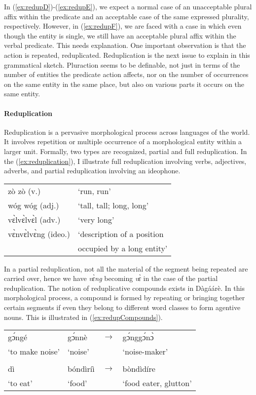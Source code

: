 In (\ref{ex:redupD})-(\ref{ex:redupE}), we expect a normal case of an unacceptable plural affix within the predicate and
an acceptable case of the same expressed plurality, respectively. However, in (\ref{ex:redupF}), we are
faced with a case in which even though the entity is single, we still have an acceptable plural
affix within the verbal predicate. This needs explanation. One important observation is that
the action is repeated, reduplicated. Reduplication is the next issue to explain in this
grammatical sketch. Pluraction seems to be definable, not just in terms of the number of
entities the predicate action affects, nor on the number of occurrences on the same entity in
the same place, but also on various parts it occurs on the same entity.

\paragraph{Reduplication}
Reduplication is a pervasive morphological process across languages of the world. It
involves repetition or multiple occurrence of a morphological entity within a larger unit.
Formally, two types are recognized, partial and full reduplication. In the (\ref{ex:reduplication}), I illustrate full reduplication involving verbs, adjectives, adverbs, and partial
reduplication involving an ideophone.

\ea \label{ex:reduplication} \begin{tabular}{ll}   zò zò (v.)& ‘run, run’\\
 wóg wóg (adj.)& ‘tall, tall; long, long’\\
 vɛ̀lvɛ̀lvɛ̀l (adv.)& ‘very long’\\
 vɛ̀nvɛ̀lvɛ̀ng (ideo.) & ‘description of a position \\
 &occupied by a long entity’\\
 \end{tabular}\z

In a partial reduplication, not all the material of the segment being repeated are carried over,
hence we have \textit{vɛ̀ng} becoming \textit{vɛ̀} in the case of the partial reduplication.
The notion of reduplicative compounds exists in Dàgáárè. In this morphological process, a
compound is formed by repeating or bringing together certain segments if even they belong to
different word classes to form agentive nouns. This is illustrated in (\ref{ex:redupCompounds}).


\ea \label{ex:redupCompounds} \begin{tabular}{llll} 
 gɔ́ngé& gɔ́nnè& $\rightarrow$ &gɔ́nggɔ́nɔ̀\\
‘to make noise’& ‘noise’&& ‘noise-maker’\\
&&&\\
dì & bóndìríì& $\rightarrow$ &bòndìdíre\\
‘to eat’& ‘food’&& ‘food eater, glutton’\\
\end{tabular}
\z 


